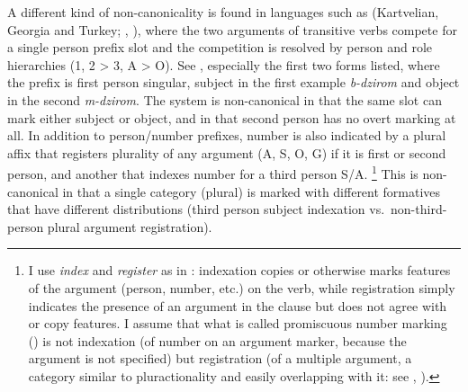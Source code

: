 \documentclass[output=collectionpaper]{langsci/langscibook}
\begin{document}
A different kind of non-canonicality is found in languages such as  (Kart\-ve\-lian, Georgia and Turkey; \citealt[283]{Lacroix2009}, \citealt[48]{Oeztuerk2011}), where the two arguments of transitive verbs compete for a single person prefix slot and the competition is resolved by person and role hierarchies (1, 2 > 3, A > O). See , especially the first two forms listed, where the prefix is first person singular, subject in the first example \textit{b-dzirom} and object in the second \textit{m-dzirom}. The system is non-canonical in that the same slot can mark either subject or object, and in that second person has no overt marking at all. In addition to person/number prefixes, number is also indicated by a plural affix that registers plurality of any argument (A, S, O, G) if it is first or second person, and another that indexes number for a third person S/A.%
\footnote{%
I use \textit{index} and \textit{register} as in \citet[48--49]{Nichols1992}: indexation copies or otherwise marks features of the argument (person, number, etc.\@) on the verb, while registration simply indicates the presence of an argument in the clause but does not agree with or copy features. I assume that what is called promiscuous number marking (\citealt{Leer1991}) is not indexation (of number on an argument marker, because the argument is not specified) but registration (of a multiple argument, a category similar to pluractionality and easily overlapping with it: see \citealt{Wood2007}, \citealt{Yu2003}).
} %
This is non-canonical in that a single category (plural) is marked with different formatives that have different distributions (third person subject indexation vs.\ non-third-person plural argument registration).
\end{document}

